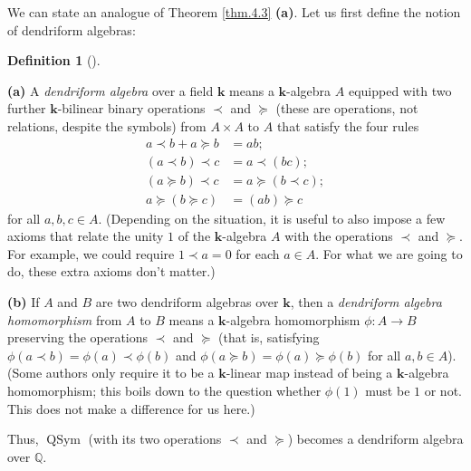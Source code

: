 \documentclass[numbers=enddot,12pt,final,onecolumn,notitlepage]{scrartcl}%
\theoremstyle{definition}
\newtheorem{defi}[theo]{Definition}
\newenvironment{definition}[1][]
{\begin{defi}[#1]\begin{leftbar}}
{\end{leftbar}\end{defi}}
\newenvironment{vershort}{}{}
\begin{document}
\begin{vershort}
We can state an analogue of Theorem
\ref{thm.4.3} \textbf{(a)}. Let us first define the notion of dendriform algebras:

\begin{definition}
\textbf{(a)} A \textit{dendriform algebra} over a field $\mathbf{k}$ means a
$\mathbf{k}$-algebra $A$ equipped with two further $\mathbf{k}$-bilinear
binary operations $\left.  \prec\right.  $ and $\left.  \succeq\right.  $
(these are operations, not relations, despite the symbols) from $A\times A$ to
$A$ that satisfy the four rules%
\begin{align*}
a\left.  \prec\right.  b+a\left.  \succeq\right.  b  &  =ab;\\
\left(  a\left.  \prec\right.  b\right)  \left.  \prec\right.  c  &  =a\left.
\prec\right.  \left(  bc\right)  ;\\
\left(  a\left.  \succeq\right.  b\right)  \left.  \prec\right.  c  &
=a\left.  \succeq\right.  \left(  b\left.  \prec\right.  c\right)  ;\\
a\left.  \succeq\right.  \left(  b\left.  \succeq\right.  c\right)   &
=\left(  ab\right)  \left.  \succeq\right.  c
\end{align*}
for all $a,b,c\in A$. (Depending on the situation, it is useful to also impose
a few axioms that relate the unity $1$ of the $\mathbf{k}$-algebra $A$ with
the operations $\left.  \prec\right.  $ and $\left.  \succeq\right.  $. For
example, we could require $1\left.  \prec\right.  a=0$ for each $a\in A$. For
what we are going to do, these extra axioms don't matter.)

\textbf{(b)} If $A$ and $B$ are two dendriform algebras over $\mathbf{k}$,
then a \textit{dendriform algebra homomorphism} from $A$ to $B$ means a
$\mathbf{k}$-algebra homomorphism $\phi:A\rightarrow B$ preserving the
operations $\left.  \prec\right.  $ and $\left.  \succeq\right.  $ (that is,
satisfying $\phi\left(  a\left.  \prec\right.  b\right)  =\phi\left(
a\right)  \left.  \prec\right.  \phi\left(  b\right)  $ and $\phi\left(
a\left.  \succeq\right.  b\right)  =\phi\left(  a\right)  \left.
\succeq\right.  \phi\left(  b\right)  $ for all $a,b\in A$). (Some authors
only require it to be a $\mathbf{k}$-linear map instead of being a
$\mathbf{k}$-algebra homomorphism; this boils down to the question whether
$\phi\left(  1\right)  $ must be $1$ or not. This does not make a difference
for us here.)
\end{definition}

Thus, $\operatorname*{QSym}$ (with its two operations $\left.  \prec\right.  $
and $\left.  \succeq\right.  $) becomes a dendriform algebra over $\mathbb{Q}$.


\end{vershort}
\end{document}
